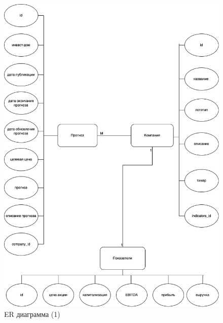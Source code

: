 \begin{figure}[h!]
	\begin{center}
		\includegraphics[scale=0.5]{img/er.drawio.png}
	\end{center}
	\captionsetup{justification=centering}
	\caption{ER диаграмма (1)}
	\label{img:er1}
\end{figure}
\newpage


